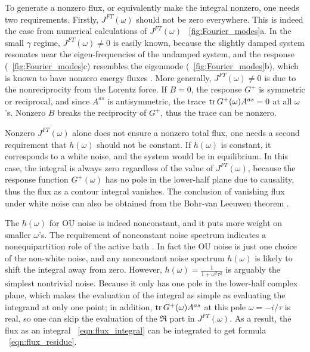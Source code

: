 \documentclass[
 preprint,
 preprintnumbers,
 amsmath,amssymb,
 aps,
 pre,
 longbibliography,
 10pt, twocolumn
]{revtex4-1}
\begin{document}
To generate a nonzero flux, or equivalently make the integral nonzero, one needs two requirements.
Firstly, $J^{FT}(\omega)$ should not be zero everywhere. 
This is indeed the case from numerical calculations of $J^{FT}(\omega)$ \figurename~\ref{fig:Fourier_modes}a. 
In the small $\gamma$ regime, $J^{FT}(\omega) \neq 0$ is easily known, because the slightly damped system resonates near the eigen-frequencies of the undamped system, and the response (\figurename~\ref{fig:Fourier_modes}c) resembles the eigenmode (\figurename~\ref{fig:Fourier_modes}b), which is known to have nonzero energy fluxes \cite{Nash2015TopologicalMetamaterials}. 
More generally, $J^{FT}(\omega) \neq 0$ is due to the nonreciprocity from the Lorentz force. If $B=0$, the response $G^+$ is symmetric or reciprocal, and since $A^{as}$ is antisymmetric, the trace $\tr G^+(\omega) A^{as}=0$ at all $\omega$'s. Nonzero $B$ breaks the reciprocity of $G^+$, thus the trace can be nonzero.

Nonzero $J^{FT}(\omega)$ alone does not ensure a nonzero total flux, one needs a second requirement that $h(\omega)$ should not be constant.
If $h(\omega)$ is constant, it corresponds to a white noise, and the system would be in equilibrium. In this case, the integral is always zero regardless of the value of $J^{FT}(\omega)$, because the response function $G^+(\omega)$ has no pole in the lower-half plane due to causality, thus the flux as a contour integral vanishes. 
The conclusion of vanishing flux under white noise can also be obtained from the Bohr-van Leeuwen theorem \cite{Pradhan2010NonexistenceSurface}.

The $h(\omega)$ for OU noise is indeed nonconstant, and it puts more weight on smaller $\omega$'s.
The requirement of nonconstant noise spectrum indicates a nonequipartition role of the active bath \cite{Lee2017FluctuationSystems.}.
In fact the OU noise is just one choice of the non-white noise, and any nonconstant noise spectrum $h(\omega)$ is likely to shift the integral away from zero.
However, $h(\omega)=\frac{1}{1+\omega^2\tau^2}$ is arguably the simplest nontrivial noise. Because it only has one pole in the lower-half complex plane, which makes the evaluation of the integral as simple as evaluating the integrand at only one point; in addition, $\tr G^+(\omega)A^{as}$ at this pole $\omega=-i/\tau$ is real, so one can skip the evaluation of the $\Re$ part in $J^{FT}(\omega)$. As a result, the flux as an integral \eqnname~\eqref{eqn:flux_integral} can be integrated to get formula \eqnname~\eqref{eqn:flux_residue}.
\end{document}
